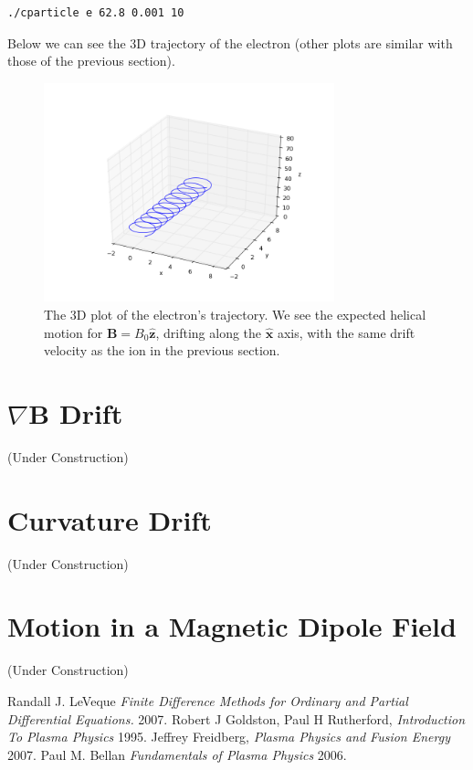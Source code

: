 \documentclass[11pt]{report}
\begin{document}
\begin{lstlisting}
./cparticle e 62.8 0.001 10
\end{lstlisting}

Below we can see the 3D trajectory of the electron (other plots are similar with those of the previous section).

\begin{figure}[!ht]
  \centering
    \includegraphics[width=0.75\textwidth]{images/drift_electron_3d}
     \caption{The 3D plot of the electron's trajectory. We see the expected helical motion for $\bm{B} = B_0 \hat{\bm{z}}$, drifting along the $\hat{\bm{x}}$ axis, with the same drift velocity as the ion in the previous section.}
\end{figure}

\newpage

\section{$\nabla \bm{B}$ Drift}
(Under Construction)

\section{Curvature Drift}
(Under Construction)

\section{Motion in a Magnetic Dipole Field}
(Under Construction)

\begin{thebibliography}{1}

   Randall J. LeVeque {\em Finite Difference Methods for Ordinary and Partial Differential Equations.}  2007.
   Robert J Goldston, Paul H Rutherford, {\em Introduction To Plasma Physics}  1995.
   Jeffrey Freidberg, {\em Plasma Physics and Fusion Energy}  2007.
   Paul M. Bellan {\em Fundamentals of Plasma Physics}  2006.

  \end{thebibliography}
\end{document}
